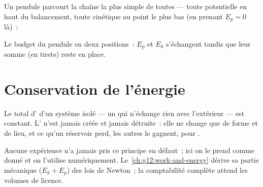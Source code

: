 Un pendule parcourt la chaîne la plus simple de toutes --- toute
potentielle en haut du balancement, toute cinétique au point le plus bas
(en prenant $E_p = 0$ là)~:

\begin{omfigure}
\qquad
{}

{\small Le budget du pendule en deux positions~: $E_p$ et $E_k$
s'échangent tandis que leur somme (en tirets) reste en place.}
\end{omfigure}

\section{Conservation de l'énergie}

\begin{theorem}\label{thm:g10:energy-conservation:conservation}
Le total d' d'un système isolé --- un qui n'échange
rien avec l'extérieur --- est constant. L' n'est
jamais créée et jamais détruite~: elle ne change que de forme et de
lieu, et ce qu'un réservoir perd, les autres le gagnent,
 pour .
\end{theorem}
\admitted

\begin{remark}\label{rem:g10:energy-conservation:admitted}
Aucune expérience n'a jamais pris ce principe en défaut~; ici on le
prend comme donné et on l'utilise numériquement.
Le~\cref{ch:g12:work-and-energy} dérive sa partie mécanique
($E_k + E_p$) des lois de Newton~; la comptabilité complète attend les
volumes de licence.
\end{remark}

